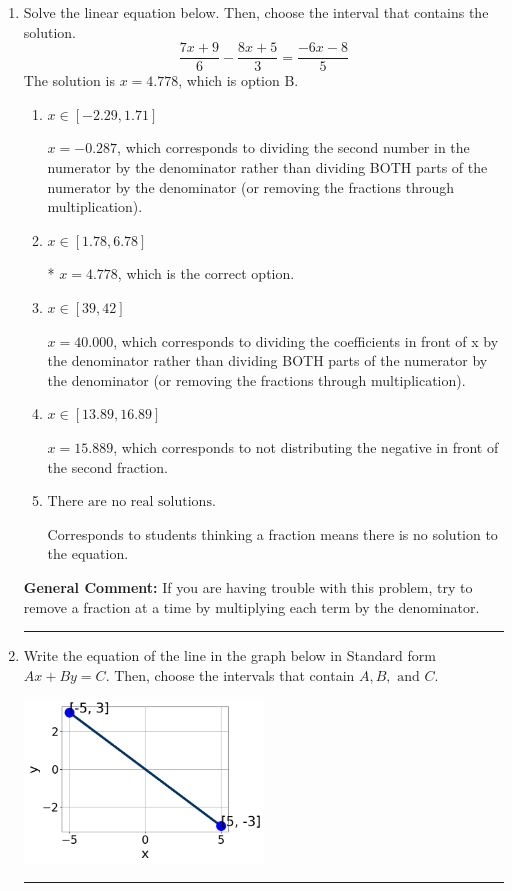 \documentclass{extbook}[14pt]
\newcommand{\litem}[1]{\item #1

\rule{\textwidth}{0.4pt}}
\begin{document}
\begin{enumerate}\litem{
Solve the linear equation below. Then, choose the interval that contains the solution.
\[ \frac{7x + 9}{6} - \frac{8x + 5}{3} = \frac{-6x -8}{5} \]
The solution is \( x = 4.778 \), which is option B.\begin{enumerate}[label=\Alph*.]
\item \( x \in [-2.29, 1.71] \)

 $x = -0.287$, which corresponds to dividing the second number in the numerator by the denominator rather than dividing BOTH parts of the numerator by the denominator (or removing the fractions through multiplication).
\item \( x \in [1.78, 6.78] \)

* $x = 4.778$, which is the correct option.
\item \( x \in [39, 42] \)

 $x = 40.000$, which corresponds to dividing the coefficients in front of x by the denominator rather than dividing BOTH parts of the numerator by the denominator (or removing the fractions through multiplication).
\item \( x \in [13.89, 16.89] \)

 $x = 15.889$, which corresponds to not distributing the negative in front of the second fraction.
\item \( \text{There are no real solutions.} \)

Corresponds to students thinking a fraction means there is no solution to the equation.
\end{enumerate}

\textbf{General Comment:} If you are having trouble with this problem, try to remove a fraction at a time by multiplying each term by the denominator.
}
\litem{
Write the equation of the line in the graph below in Standard form $Ax+By=C$. Then, choose the intervals that contain $A, B, \text{ and } C$.

\begin{center}
    \includegraphics[width=0.5\textwidth]{../Figures/linearGraphToStandardB.png}
\end{center}



}
\end{enumerate}
\end{document}
